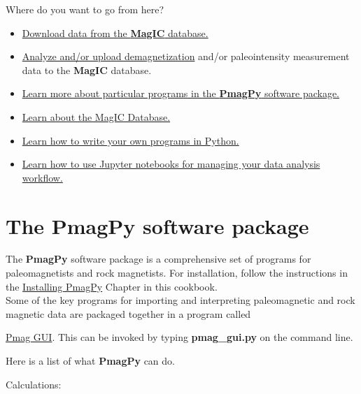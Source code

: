 \documentclass[11pt]{book}
\begin{document}
{Where do you want to go from here?

\begin{itemize}
\item \href{#magic_download}{Download data from the {\bf MagIC} database.}
\item \href{#pmag_gui.py}{Analyze and/or upload demagnetization} and/or paleointensity measurement data to the {\bf MagIC} database.
\item \href{#PmagPy}{Learn more about particular programs in the {\bf PmagPy} software package.}
\item \href{#MagICDatabase}{Learn about the MagIC Database.}
\item \href{#Python}{Learn how to write your own programs in Python.}
\item \href{#Notebooks}{Learn how to use Jupyter notebooks for managing your data analysis workflow.}
\end{itemize}



\chapter{The {\bf PmagPy} software package}
\label{chap:PmagPy}

The {\bf PmagPy} software package is a comprehensive set of programs for paleomagnetists and rock magnetists.  For installation,  follow the instructions in the \href{#quick_start}{Installing PmagPy} Chapter in this cookbook. \\

Some of the key programs for importing and interpreting paleomagnetic and rock magnetic data are packaged together in a program called {\href{#pmag_gui.py}{Pmag GUI}.  This can be invoked by typing {\bf pmag\_gui.py} on the command line.

Here is a list of what {\bf PmagPy} can do.

Calculations:

\begin{itemize}


\end{itemize}}}
\end{document}
